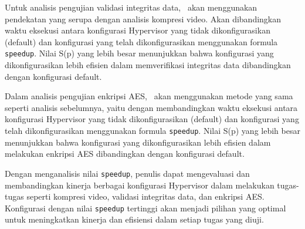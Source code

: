 Untuk analisis pengujian validasi integritas data, \saya\ akan menggunakan pendekatan yang serupa dengan analisis kompresi video. Akan dibandingkan waktu eksekusi antara konfigurasi Hypervisor yang tidak dikonfigurasikan (default) dan konfigurasi yang telah dikonfigurasikan menggunakan formula \texttt{speedup}. Nilai S(p) yang lebih besar menunjukkan bahwa konfigurasi yang dikonfigurasikan lebih efisien dalam memverifikasi integritas data dibandingkan dengan konfigurasi default.

Dalam analisis pengujian enkripsi AES, \saya\ akan menggunakan metode yang sama seperti analisis sebelumnya, yaitu dengan membandingkan waktu eksekusi antara konfigurasi Hypervisor yang tidak dikonfigurasikan (default) dan konfigurasi yang telah dikonfigurasikan menggunakan formula \texttt{speedup}. Nilai S(p) yang lebih besar menunjukkan bahwa konfigurasi yang dikonfigurasikan lebih efisien dalam melakukan enkripsi AES dibandingkan dengan konfigurasi default.

Dengan menganalisis nilai \texttt{speedup}, penulis dapat mengevaluasi dan membandingkan kinerja berbagai konfigurasi Hypervisor dalam melakukan tugas-tugas seperti kompresi video, validasi integritas data, dan enkripsi AES. Konfigurasi dengan nilai \texttt{speedup} tertinggi akan menjadi pilihan yang optimal untuk meningkatkan kinerja dan efisiensi dalam setiap tugas yang diuji.